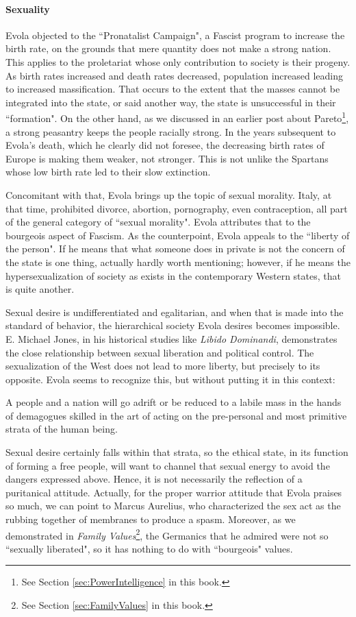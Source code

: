 \paragraph{Sexuality}
Evola objected to the ``Pronatalist Campaign", a Fascist program to increase the birth rate, on the grounds that mere quantity does not make a strong nation. This applies to the proletariat whose only contribution to society is their progeny. As birth rates increased and death rates decreased, population increased leading to increased massification. That occurs to the extent that the masses cannot be integrated into the state, or said another way, the state is unsuccessful in their ``formation". On the other hand, as we discussed in an earlier post about Pareto\footnote{See Section \ref{sec:PowerIntelligence} in this book.}, a strong peasantry keeps the people racially strong. In the years subsequent to Evola's death, which he clearly did not foresee, the decreasing birth rates of Europe is making them weaker, not stronger. This is not unlike the Spartans whose low birth rate led to their slow extinction.

Concomitant with that, Evola brings up the topic of sexual morality. Italy, at that time, prohibited divorce, abortion, pornography, even contraception, all part of the general category of ``sexual morality". Evola attributes that to the bourgeois aspect of Fascism. As the counterpoint, Evola appeals to the ``liberty of the person". If he means that what someone does in private is not the concern of the state is one thing, actually hardly worth mentioning; however, if he means the hypersexualization of society as exists in the contemporary Western states, that is quite another.

Sexual desire is undifferentiated and egalitarian, and when that is made into the standard of behavior, the hierarchical society Evola desires becomes impossible. E. Michael Jones, in his historical studies like \textit{Libido Dominandi}, demonstrates the close relationship between sexual liberation and political control. The sexualization of the West does not lead to more liberty, but precisely to its opposite. Evola seems to recognize this, but without putting it in this context:

\begin{quotex}
A people and a nation will go adrift or be reduced to a labile mass in the hands of demagogues skilled in the art of acting on the pre-personal and most primitive strata of the human being. 

\end{quotex}
Sexual desire certainly falls within that strata, so the ethical state, in its function of forming a free people, will want to channel that sexual energy to avoid the dangers expressed above. Hence, it is not necessarily the reflection of a puritanical attitude. Actually, for the proper warrior attitude that Evola praises so much, we can point to Marcus Aurelius, who characterized the sex act as the rubbing together of membranes to produce a spasm. Moreover, as we demonstrated in \textit{Family Values}\footnote{See Section \ref{sec:FamilyValues} in this book.}, the Germanics that he admired were not so ``sexually liberated", so it has nothing to do with ``bourgeois" values.

